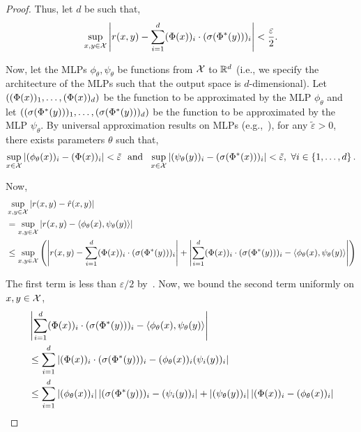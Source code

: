 \begin{proof}
    Thus, let $d$ be such that,
    \begin{equation}\label{eq:thm1_proof_eq1}
        \sup_{x,y \in {\mathcal{X}}} \left\lvert r(x, y) - \sum_{i=1}^{d} (\Phi(x))_i \cdot (\sigma(\Phi^*(y)))_i\right\rvert < \frac{\varepsilon}{2}.
    \end{equation}

    Now, let the MLPs $\phi_\theta, \psi_\theta$ be functions from ${\mathcal{X}}$ to $\mathbb{R}^{d}$ (i.e., we specify the architecture of the MLPs such that the output space is $d$-dimensional). Let $\left((\Phi(x))_1, \ldots, (\Phi(x))_{d}\right)$ be the function to be approximated by the MLP $\phi_\theta$ and let $\left((\sigma(\Phi^*(y)))_1, \ldots, (\sigma(\Phi^*(y)))_{d}\right)$ be the function to be approximated by the MLP $\psi_\theta$. By universal approximation results on MLPs (e.g.,~\parencite{barronUniversalApproximation1993, cybenkoApproximationSuperpositions1989, hornikMultilayerFeedforward1989}), for any $\tilde{\varepsilon} > 0$, there exists parameters $\theta$ such that,
    \begin{equation}\label{eq:thm1_proof_eq2}
        \sup_{x \in {\mathcal{X}}} \left\lvert(\phi_\theta(x))_i - (\Phi(x))_{i}\right\rvert < \tilde{\varepsilon} \ \text{ and } \ \sup_{x \in {\mathcal{X}}} \left\lvert(\psi_\theta(y))_i - (\sigma(\Phi^*(x)))_{i}\right\rvert < \tilde{\varepsilon}, \ \forall i \in \left\{1, \ldots, d\right\}.
    \end{equation}

    Now,
    \begin{align*}
        &\sup_{x,y \in {\mathcal{X}}} \left\lvert r(x,y) - \hat{r}(x,y)\right\rvert \\
        &= \sup_{x,y \in {\mathcal{X}}} \left\lvert r(x,y) - \left \langle \phi_\theta(x), \psi_\theta(y) \right\rangle\right\rvert \\
        &\leq \sup_{x,y\in {\mathcal{X}}} \left(\left\lvert r(x,y) - \sum_{i=1}^{d} (\Phi(x))_i \cdot (\sigma(\Phi^*(y)))_i\right\rvert + \left\lvert\sum_{i=1}^{d} (\Phi(x))_i \cdot (\sigma(\Phi^*(y)))_i - \left \langle \phi_\theta(x), \psi_\theta(y) \right\rangle\right\rvert\right) \\
    \end{align*}

    The first term is less than $\varepsilon / 2$ by~. Now, we bound the second term uniformly on $x,y \in {\mathcal{X}}$,
    \begin{align*}
        &\left\lvert\sum_{i=1}^{d} (\Phi(x))_i \cdot (\sigma(\Phi^*(y)))_i - \left \langle \phi_\theta(x), \psi_\theta(y) \right\rangle\right\rvert \\
        &\leq \sum_{i=1}^{d} \left\lvert(\Phi(x))_i \cdot (\sigma(\Phi^*(y)))_i - (\phi_\theta(x))_i(\psi_i(y))_i\right\rvert \\
        &\leq \sum_{i=1}^{d} \left\lvert(\phi_\theta(x))_i\right\rvert \left\lvert(\sigma(\Phi^*(y)))_i - (\psi_i(y))_i\right\rvert + \left\lvert(\psi_\theta(y))_i\right\rvert \left\lvert(\Phi(x))_i - (\phi_\theta(x))_i\right\rvert\\
    \end{align*}


\end{proof}

